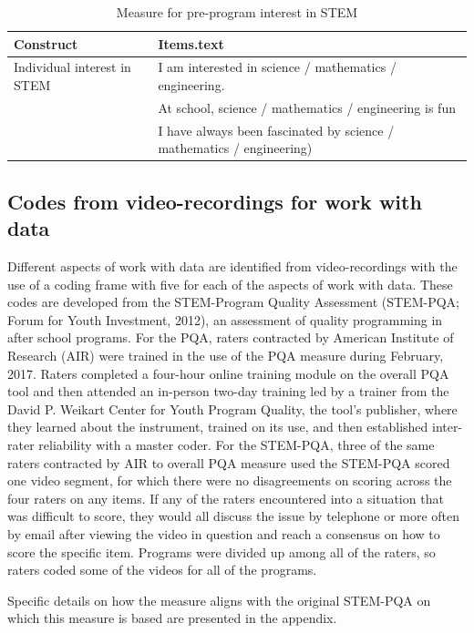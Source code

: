 \documentclass[]{book}
\theoremstyle{definition}
\theoremstyle{definition}
\theoremstyle{definition}
\theoremstyle{remark}
\begin{document}
\begin{table}

\caption{\label{tab:unnamed-chunk-5}Measure for pre-program interest in STEM}
\centering
\begin{tabular}[t]{ll}
\toprule
Construct & Items.text\\
\midrule
Individual interest in STEM & I am interested in science / mathematics / engineering.\\
 & At school, science / mathematics / engineering is fun\\
 & I have always been fascinated by science / mathematics / engineering)\\
\bottomrule
\end{tabular}
\end{table}

\subsection{Codes from video-recordings for work with
data}\label{codes-from-video-recordings-for-work-with-data}

Different aspects of work with data are identified from video-recordings
with the use of a coding frame with five for each of the aspects of work
with data. These codes are developed from the STEM-Program Quality
Assessment (STEM-PQA; Forum for Youth Investment, 2012), an assessment
of quality programming in after school programs. For the PQA, raters
contracted by American Institute of Research (AIR) were trained in the
use of the PQA measure during February, 2017. Raters completed a
four-hour online training module on the overall PQA tool and then
attended an in-person two-day training led by a trainer from the David
P. Weikart Center for Youth Program Quality, the tool's publisher, where
they learned about the instrument, trained on its use, and then
established inter-rater reliability with a master coder. For the
STEM-PQA, three of the same raters contracted by AIR to overall PQA
measure used the STEM-PQA scored one video segment, for which there were
no disagreements on scoring across the four raters on any items. If any
of the raters encountered into a situation that was difficult to score,
they would all discuss the issue by telephone or more often by email
after viewing the video in question and reach a consensus on how to
score the specific item. Programs were divided up among all of the
raters, so raters coded some of the videos for all of the programs.

Specific details on how the measure aligns with the original STEM-PQA on
which this measure is based are presented in the appendix.
\end{document}
